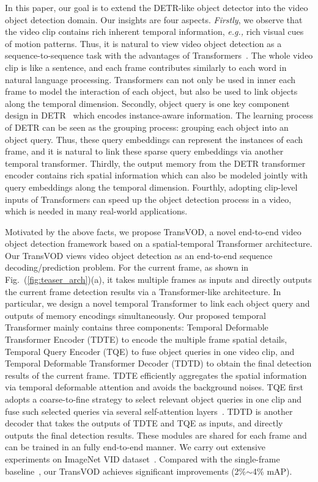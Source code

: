\documentclass[10pt,journal,compsoc]{IEEEtran}
\begin{document}
In this paper, our goal is to extend the DETR-like object detector into the video object detection domain. Our insights are four aspects. \textit{Firstly}, we observe that the video clip contains rich inherent temporal information, \emph{e.g.,} rich visual cues of motion patterns. Thus, it is natural to view video object detection as a sequence-to-sequence task with the advantages of Transformers~\cite{Vaswani17attention}. 
The whole video clip is like a sentence, and each frame contributes similarly to each word in natural language processing. Transformers can not only be used in inner each frame to model the interaction of each object, but also be used to link objects along the temporal dimension. Secondly, object query is one key component design in DETR~\cite{detr} which encodes instance-aware information. The learning process of DETR can be seen as the grouping process: grouping each object into an object query. Thus, these query embeddings can represent the instances of each frame, and it is natural to link these sparse query embeddings via another temporal transformer. Thirdly, the output memory from the DETR transformer encoder contains rich spatial information which can also be modeled jointly with query embeddings along the temporal dimension. Fourthly, adopting clip-level inputs of Transformers can speed up the object detection process in a video, which is needed in many real-world applications. 

Motivated by the above facts, we propose TransVOD, a novel end-to-end video object detection framework based on a spatial-temporal Transformer architecture. Our TransVOD views video object detection as an end-to-end sequence decoding/prediction problem. For the current frame, as shown in Fig.~(\ref{fig:teaser_arch})(a), it takes multiple frames as inputs and directly outputs the current frame detection results via a Transformer-like architecture. In particular, we design a novel temporal Transformer to link each object query and outputs of memory encodings simultaneously. Our proposed temporal Transformer mainly contains three components: Temporal Deformable Transformer Encoder (TDTE) to encode the multiple frame spatial details, Temporal Query Encoder (TQE) to fuse object queries in one video clip, and Temporal Deformable Transformer Decoder (TDTD) to obtain the final detection results of the current frame. TDTE efficiently aggregates the spatial information via temporal deformable attention and avoids the background noises. TQE first adopts a coarse-to-fine strategy to select relevant object queries in one clip and fuse such selected queries via several self-attention layers~\cite{Vaswani17attention}. TDTD is another decoder that takes the outputs of TDTE and TQE as inputs, and directly outputs the final detection results. These modules are shared for each frame and can be trained in an fully end-to-end manner. We carry out extensive experiments on ImageNet VID dataset~\cite{russakovsky2015imagenet}. Compared with the single-frame baseline~\cite{zhu2020deformable}, our TransVOD achieves significant improvements (2\%$\sim$4\% mAP). 
\end{document}

